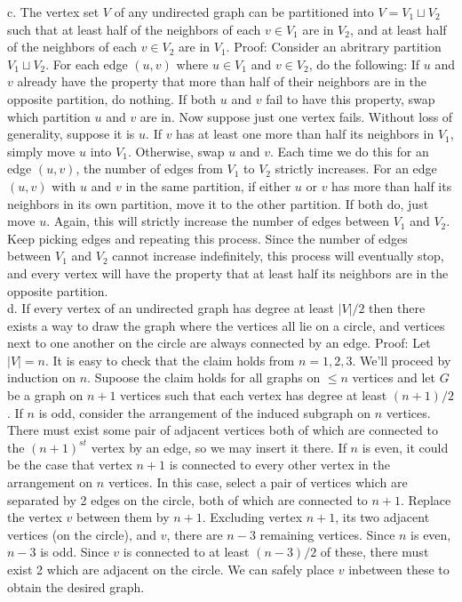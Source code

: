 \documentclass{article}
\begin{document}
c. The vertex set $V$ of any undirected graph can be partitioned into $V = V_1 \sqcup V_2$ such that at least half of the neighbors of each $v \in V_1$ are in $V_2$, and at least half of the neighbors of each $v \in V_2$ are in $V_1$.  Proof: Consider an abritrary partition $V_1 \sqcup V_2$.  For each edge $(u,v)$ where $u \in V_1$ and $v \in V_2$, do the following:  If $u$ and $v$ already have the property that more than half of their neighbors are in the opposite partition, do nothing.  If both $u$ and $v$ fail to have this property, swap which partition $u$ and $v$ are in.  Now suppose just one vertex fails.  Without loss of generality, suppose it is $u$.  If $v$ has at least one more than half its neighbors in $V_1$, simply move $u$ into $V_1$.  Otherwise, swap $u$ and $v$.  Each time we do this for an edge $(u,v)$, the number of edges from $V_1$ to $V_2$ strictly increases.  For an edge $(u,v)$ with $u$ and $v$ in the same partition, if either $u$ or $v$ has more than half its neighbors in its own partition, move it to the other partition.  If both do, just move $u$.  Again, this will strictly increase the number of edges between $V_1$ and $V_2$.  Keep picking edges and repeating this process.  Since the number of edges between $V_1$ and $V_2$ cannot increase indefinitely, this process will eventually stop, and every vertex will have the property that at least half its neighbors are in the opposite partition.\\

d. If every vertex of an undirected graph has degree at least $|V|/2$ then there exists a way to draw the graph where the vertices all lie on a circle, and vertices next to one another on the circle are always connected by an edge. Proof: Let $|V| = n$.  It is easy to check that the claim holds from $n=1, 2, 3$.  We'll proceed by induction on $n$.  Supoose the claim holds for all graphs on $\leq n $ vertices and let $G$ be a graph on $n+1$ vertices such that each vertex has degree at least $(n+1)/2$.  If $n$ is odd, consider the arrangement of the induced subgraph on $n$ vertices.  There must exist some pair of adjacent vertices both of which are connected to the $(n+1)^{st}$ vertex by an edge, so we may insert it there.  If $n$ is even, it could be the case that vertex $n+1$ is connected to every other vertex in the arrangement on $n$ vertices.  In this case, select a pair of vertices which are separated by 2 edges on the circle, both of which are connected to $n+1$.  Replace the vertex $v$ between them by $n+1$.  Excluding vertex $n+1$, its two adjacent vertices (on the circle), and $v$, there are $n-3$ remaining vertices.  Since $n$ is even, $n-3$ is odd.  Since $v$ is connected to at least $(n-3)/2$ of these, there must exist 2 which are adjacent on the circle.  We can safely place $v$ inbetween these to obtain the desired graph. \\
\end{document}
